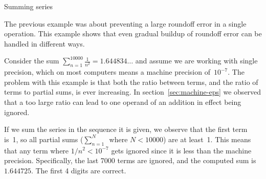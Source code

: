 

 {Summing series}
\label{sec:fp-summing}

The previous example was about preventing a large roundoff error in a
single operation. This example shows that even gradual buildup of
roundoff error can be handled in different ways.

Consider the sum $\sum_{n=1}^{10000}\frac{1}{n^2}=1.644834\ldots$
and assume we are working with single precision, which on most computers
means a machine precision of~$10^{-7}$. The problem with this example
is that both the ratio between terms, and the ratio of terms to
partial sums, is ever increasing. In section~\ref{sec:machine-eps} we
observed that a too large ratio can lead to one operand of an addition in
effect being ignored.

If we sum the series in the sequence it is given, we observe that
the first term is~1, so all partial sums ($\sum_{n=1}^N$~where $N<10000$)
are at least~1. This means that any term where $1/n^2<10^{-7}$ gets
ignored since it is less than the machine precision.
Specifically, the last 7000 terms are ignored, and
the computed sum is~$1.644725$. The first 4 digits are correct.

